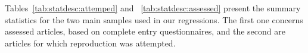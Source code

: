 Tables~\ref{tab:statdesc:attemped} and ~\ref{tab:statdesc:assessed} present the summary statistics for the two main samples used in our regressions. The first one concerns assessed articles, based on complete entry questionnaires, and the second are articles for which reproduction was attempted.




